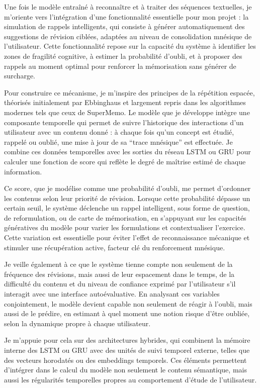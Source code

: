 \documentclass[11pt,a4paper]{report}
\begin{document}
Une fois le modèle entraîné à reconnaître et à traiter des séquences textuelles, je m’oriente vers l’intégration d’une fonctionnalité essentielle pour mon projet : la simulation de rappels intelligents, qui consiste à générer automatiquement des suggestions de révision ciblées, adaptées au niveau de consolidation mnésique de l’utilisateur. Cette fonctionnalité repose sur la capacité du système à identifier les zones de fragilité cognitive, à estimer la probabilité d’oubli, et à proposer des rappels au moment optimal pour renforcer la mémorisation sans générer de surcharge.

Pour construire ce mécanisme, je m’inspire des principes de la répétition espacée, théorisés initialement par Ebbinghaus et largement repris dans les algorithmes modernes tels que ceux de SuperMemo. Le modèle que je développe intègre une composante temporelle qui permet de suivre l’historique des interactions d’un utilisateur avec un contenu donné : à chaque fois qu’un concept est étudié, rappelé ou oublié, une mise à jour de sa “trace mnésique” est effectuée. Je combine ces données temporelles avec les sorties du réseau LSTM ou GRU pour calculer une fonction de score qui reflète le degré de maîtrise estimé de chaque information.

Ce score, que je modélise comme une probabilité d’oubli, me permet d’ordonner les contenus selon leur priorité de révision. Lorsque cette probabilité dépasse un certain seuil, le système déclenche un rappel intelligent, sous forme de question, de reformulation, ou de carte de mémorisation, en s’appuyant sur les capacités génératives du modèle pour varier les formulations et contextualiser l’exercice. Cette variation est essentielle pour éviter l’effet de reconnaissance mécanique et stimuler une récupération active, facteur clé du renforcement mnésique.

Je veille également à ce que le système tienne compte non seulement de la fréquence des révisions, mais aussi de leur espacement dans le temps, de la difficulté du contenu et du niveau de confiance exprimé par l’utilisateur s’il interagit avec une interface autoévaluative. En analysant ces variables conjointement, le modèle devient capable non seulement de réagir à l’oubli, mais aussi de le prédire, en estimant à quel moment une notion risque d’être oubliée, selon la dynamique propre à chaque utilisateur.

Je m’appuie pour cela sur des architectures hybrides, qui combinent la mémoire interne des LSTM ou GRU avec des unités de suivi temporel externe, telles que des vecteurs horodatés ou des embeddings temporels. Ces éléments permettent d’intégrer dans le calcul du modèle non seulement le contenu sémantique, mais aussi les régularités temporelles propres au comportement d’étude de l’utilisateur.
\end{document}
